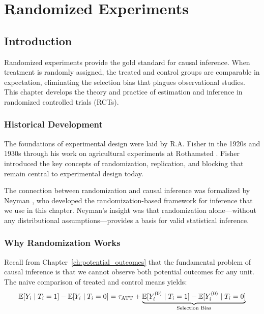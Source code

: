 \chapter{Randomized Experiments}
\label{ch:rct}


\section{Introduction}
\label{sec:rct_intro}

Randomized experiments provide the gold standard for causal inference. When treatment is randomly assigned, the treated and control groups are comparable in expectation, eliminating the selection bias that plagues observational studies. This chapter develops the theory and practice of estimation and inference in randomized controlled trials (RCTs).

\subsection{Historical Development}

The foundations of experimental design were laid by R.A. Fisher in the 1920s and 1930s through his work on agricultural experiments at Rothamsted \cite{fisher1935design}. Fisher introduced the key concepts of randomization, replication, and blocking that remain central to experimental design today.

The connection between randomization and causal inference was formalized by Neyman \cite{neyman1923application}, who developed the randomization-based framework for inference that we use in this chapter. Neyman's insight was that randomization alone---without any distributional assumptions---provides a basis for valid statistical inference.

\subsection{Why Randomization Works}

Recall from Chapter~\ref{ch:potential_outcomes} that the fundamental problem of causal inference is that we cannot observe both potential outcomes for any unit. The naive comparison of treated and control means yields:
\begin{equation}
\mathbb{E}[Y_i \mid T_i = 1] - \mathbb{E}[Y_i \mid T_i = 0] = \tau_{\text{ATT}} + \underbrace{\mathbb{E}[Y^{(0)}_i \mid T_i = 1] - \mathbb{E}[Y^{(0)}_i \mid T_i = 0]}_{\text{Selection Bias}}
\end{equation}

